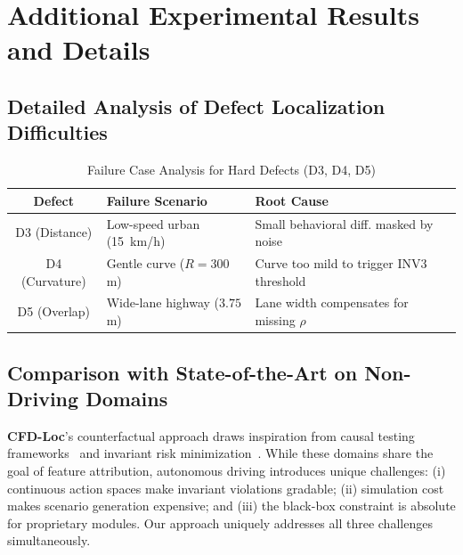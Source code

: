 \documentclass[conference]{IEEEtran}
\theoremstyle{plain}
\newcommand{\methodname}{\textbf{CFD-Loc}}
\begin{document}
\appendices
\section{Additional Experimental Results and Details}
\label{sec:appendix}

\subsection{Detailed Analysis of Defect Localization Difficulties}
\begin{table}[h]
\centering
\caption{Failure Case Analysis for Hard Defects (D3, D4, D5)}
\label{tab:failures}
\small
\begin{tabular}{cp{3cm}p{3cm}}
\toprule
\textbf{Defect} & \textbf{Failure Scenario} & \textbf{Root Cause}\\\midrule
D3 (Distance) & Low-speed urban (15~km/h) & Small behavioral diff. masked by noise\\
D4 (Curvature) & Gentle curve ($R=300$m) & Curve too mild to trigger INV3 threshold\\
D5 (Overlap) & Wide-lane highway ($3.75$m) & Lane width compensates for missing $\rho$\\
\bottomrule
\end{tabular}
\end{table}

\subsection{Comparison with State-of-the-Art on Non-Driving Domains}
\methodname's counterfactual approach draws inspiration from causal testing frameworks~\cite{zhao2023causal} and invariant risk minimization~\cite{arjovsky2019invariant}. While these domains share the goal of feature attribution, autonomous driving introduces unique challenges: (i) continuous action spaces make invariant violations gradable; (ii) simulation cost makes scenario generation expensive; and (iii) the black-box constraint is absolute for proprietary modules. Our approach uniquely addresses all three challenges simultaneously.
\end{document}

